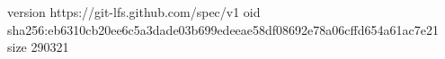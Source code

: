 version https://git-lfs.github.com/spec/v1
oid sha256:eb6310cb20ee6c5a3dade03b699edeeae58df08692e78a06cffd654a61ac7e21
size 290321
